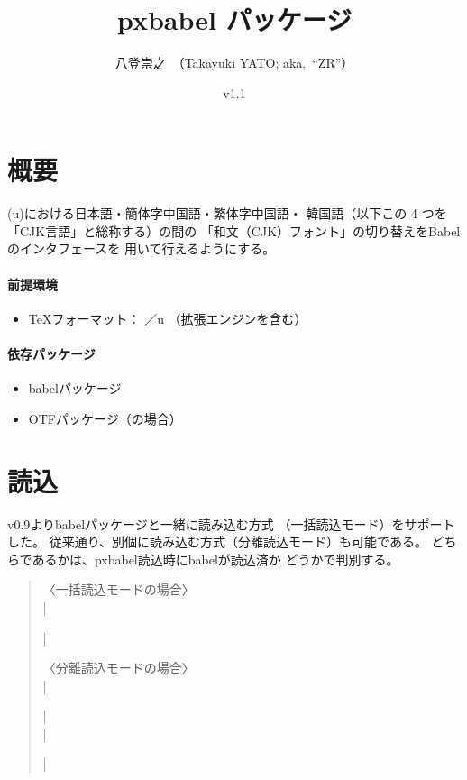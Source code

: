 \documentclass[a4paper,uplatex]{jsarticle}
\newcommand{\PkgVersion}{1.1}
\newcommand{\PkgDate}{2017/05/29}
\newcommand{\Pkg}[1]{\textsf{#1}}
\newcommand{\Meta}[1]{$\langle$\mbox{}#1\mbox{}$\rangle$}
\providecommand{\upLaTeX}{u\pLaTeX}
\begin{document}
\title{\Pkg{pxbabel} パッケージ}
\author{八登崇之\ （Takayuki YATO; aka.~``ZR''）}
\date{v\PkgVersion \quad [\PkgDate]}
\maketitle

\section{概要}

{(u)\pLaTeX}における日本語・簡体字中国語・繁体字中国語・
韓国語（以下この 4 つを「CJK言語」と総称する）の間の
「和文（CJK）フォント」の切り替えをBabelのインタフェースを
用いて行えるようにする。

\paragraph{前提環境}

\begin{itemize}
\item {\TeX}フォーマット： {\pLaTeX}／{\upLaTeX}
  （拡張エンジンを含む）
\end{itemize}

\paragraph{依存パッケージ}

\begin{itemize}
\item \Pkg{babel}パッケージ
\item \Pkg{OTF}パッケージ（{\pLaTeX}の場合）
\end{itemize}

\section{読込}

v0.9より\Pkg{babel}パッケージと一緒に読み込む方式
（一括読込モード）をサポートした。
従来通り、別個に読み込む方式（分離読込モード）も可能である。
どちらであるかは、\Pkg{pxbabel}読込時に\Pkg{babel}が読込済か
どうかで判別する。

\begin{quote}
〈一括読込モードの場合〉\\
|\usepackage[|\Meta{オプション}|]{pxbabel}|
\par\bigskip
〈分離読込モードの場合〉\\
|\usepackage[|\Meta{Babelのオプション}|]{babel}|\\
|\usepackage[|\Meta{オプション}|]{pxbabel}|
\end{quote}
\end{document}
